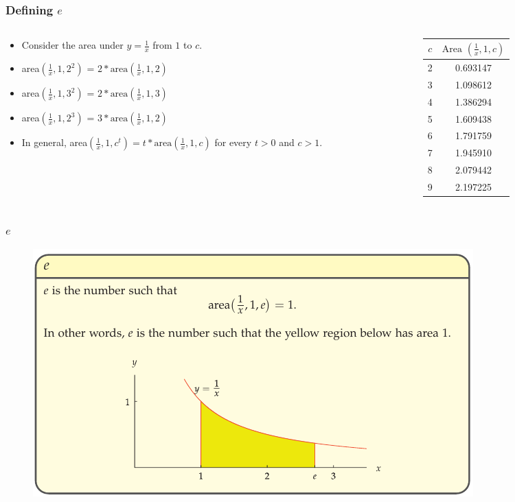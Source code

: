 \documentclass{beamer}
\begin{document}
\begin{frame}
  \frametitle{Defining \(e\)}
  \begin{columns}
    \begin{column}{0.5\textwidth}
      \begin{itemize}
        \item Consider the area under \(y = \frac{1}{x}\) from \(1\) to \(c\).
        \item area\((\frac{1}{x},1,2^{2})\) = \(2*\text{area}(\frac{1}{x},1,2)\)
        \item area\((\frac{1}{x},1,3^{2})\) = \(2*\text{area}(\frac{1}{x},1,3)\)                 
        \item area\((\frac{1}{x},1,2^{3})\) = \(3*\text{area}(\frac{1}{x},1,2)\)
        \item In general, area\((\frac{1}{x},1,c^{t}) = t*\text{area}(\frac{1}{x},1,c)\) for every \(t>0\) and \(c>1\).
      \end{itemize}
    \end{column}
    \begin{column}{0.5\textwidth}
      \begin{tabular}{|c|c|}
        \hline
        \( c \) & \( \text{Area }( \frac{1}{x},1, c )\) \\
        \hline
        2 & 0.693147 \\
        3 & 1.098612 \\
        4 & 1.386294 \\
        5 & 1.609438 \\
        6 & 1.791759 \\
        7 & 1.945910 \\
        8 & 2.079442 \\
        9 & 2.197225 \\
        \hline
      \end{tabular}
    \end{column}
  \end{columns}
\end{frame}


\begin{frame}
  \frametitle{\(e \) }
  \begin{figure}
    \includegraphics[scale=0.5]{e_4.png}
  \end{figure}
\end{frame}
\end{document}

